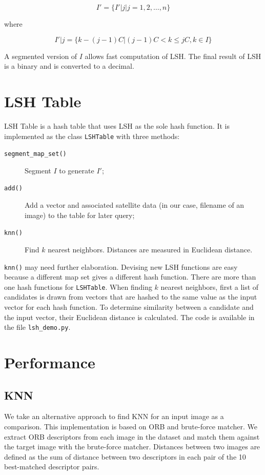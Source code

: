 \documentclass{ee208report}
\begin{document}
\begin{multicols*}{2}
\[
    I' = \{I'|j|j = 1, 2,\dots, n\}
\]

where

\[
    I'|j = \{k - (j - 1)C|(j - 1)C < k \leq jC, k \in I\}
\]

A segmented version of $I$ allows fast computation of LSH. The final result of
LSH is a binary and is converted to a decimal.

\section{LSH Table}

LSH Table is a hash table that uses LSH as the sole hash function. It is
implemented as the class \texttt{LSHTable} with three methods:

\begin{description}
    \item[\texttt{segment\_map\_set()}] Segment $I$ to generate $I'$;
    \item[\texttt{add()}] Add a vector and associated satellite data (in our
    case, filename of an image) to the table for later query;
    \item[\texttt{knn()}] Find $k$ nearest neighbors. Distances are measured in
    Euclidean distance.
\end{description}

\texttt{knn()} may need further elaboration. Devising new LSH functions are easy
because a different map set gives a different hash function. There are more than
one hash functions for \texttt{LSHTable}. When finding $k$ nearest neighbors,
first a list of candidates is drawn from vectors that are hashed to the same
value as the input vector for each hash function. To determine similarity
between a candidate and the input vector, their Euclidean distance is
calculated. The code is available in the file \texttt{lsh\_demo.py}.

\section{Performance}

\subsection{KNN}

We take an alternative approach to find KNN for an input image as a comparison.
This implementation is based on ORB and brute-force matcher. We extract ORB
descriptors from each image in the dataset and match them against the target
image with the brute-force matcher. Distances between two images are defined as
the sum of distance between two descriptors in each pair of the 10 best-matched
descriptor pairs.


\end{multicols*}
\end{document}
